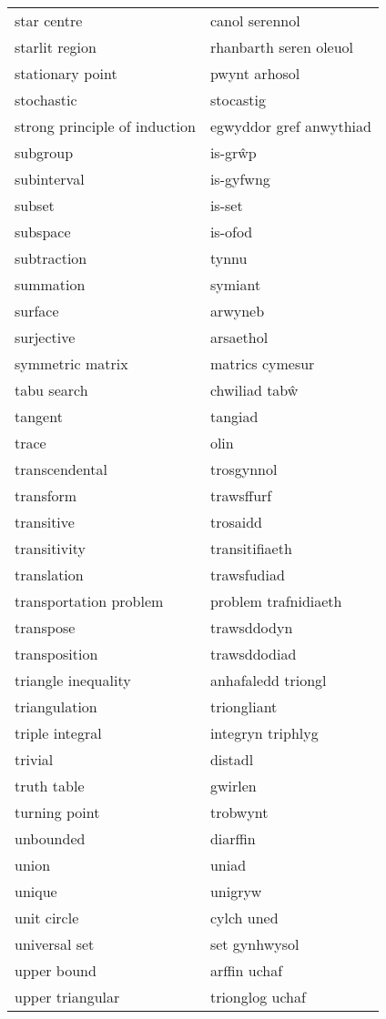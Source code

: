 \begin{supertabular}{p{0.22\textwidth}p{0.22\textwidth}}
star centre & canol serennol \\
starlit region & rhanbarth seren oleuol \\
stationary point & pwynt arhosol \\
stochastic & stocastig \\
strong principle of induction & egwyddor gref anwythiad \\
subgroup & is-grŵp \\
subinterval & is-gyfwng \\
subset & is-set \\
subspace & is-ofod \\
subtraction & tynnu \\
summation & symiant \\
surface & arwyneb \\
surjective & arsaethol \\
symmetric matrix & matrics cymesur \\
tabu search & chwiliad tabŵ \\
tangent & tangiad \\
trace & olin \\
transcendental & trosgynnol \\
transform & trawsffurf \\
transitive & trosaidd \\
transitivity & transitifiaeth \\
translation & trawsfudiad \\
transportation problem & problem trafnidiaeth \\
transpose & trawsddodyn \\
transposition & trawsddodiad \\
triangle inequality & anhafaledd triongl \\
triangulation & triongliant \\
triple integral & integryn triphlyg \\
trivial & distadl \\
truth table & gwirlen \\
turning point & trobwynt \\
unbounded & diarffin \\
union & uniad \\
unique & unigryw \\
unit circle & cylch uned \\
universal set & set gynhwysol \\
upper bound & arffin uchaf \\
upper triangular & trionglog uchaf \\

\end{supertabular}
